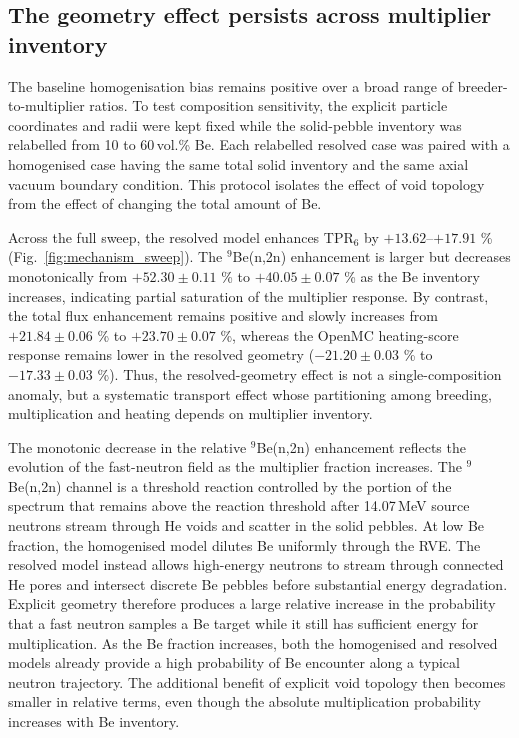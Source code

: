 \documentclass[preprint,12pt]{elsarticle}
\begin{document}
\subsection{The geometry effect persists across multiplier inventory}

The baseline homogenisation bias remains positive over a broad range of
breeder-to-multiplier ratios.  To test composition sensitivity, the explicit
particle coordinates and radii were kept fixed while the solid-pebble inventory
was relabelled from 10 to 60\,vol.\% Be.  Each relabelled resolved case was
paired with a homogenised case having the same total solid inventory and the
same axial vacuum boundary condition.  This protocol isolates the effect of
void topology from the effect of changing the total amount of Be.

Across the full sweep, the resolved model enhances TPR$_6$ by
$+13.62$--$+17.91$ \% (Fig.~\ref{fig:mechanism_sweep}).  The $^9$Be(n,2n)
enhancement is larger but decreases monotonically from $+52.30\pm0.11$ \% to
$+40.05\pm0.07$ \% as the Be inventory increases, indicating partial saturation
of the multiplier response.  By contrast, the
total flux enhancement remains positive and slowly increases from
$+21.84\pm0.06$ \% to $+23.70\pm0.07$ \%, whereas the OpenMC heating-score response remains
lower in the resolved geometry ($-21.20\pm0.03$ \% to $-17.33\pm0.03$ \%).
Thus, the resolved-geometry
effect is not a single-composition anomaly, but a systematic transport effect
whose partitioning among breeding, multiplication and heating depends on
multiplier inventory.

The monotonic decrease in the relative $^9$Be(n,2n) enhancement reflects the
evolution of the fast-neutron field as the multiplier fraction increases.  The
$^9$Be(n,2n) channel is a threshold reaction controlled by the portion of the
spectrum that remains above the reaction threshold after 14.07\,MeV source
neutrons stream through He voids and scatter in the solid pebbles.  At low Be
fraction, the homogenised model dilutes Be uniformly through the RVE.  The
resolved model instead allows high-energy neutrons to stream through connected
He pores and intersect discrete Be pebbles before substantial energy
degradation.  Explicit geometry therefore produces a large relative increase in
the probability that a fast neutron samples a Be target while it still has
sufficient energy for multiplication.  As the Be fraction increases, both the
homogenised and resolved models already provide a high probability of Be
encounter along a typical neutron trajectory.  The additional benefit of
explicit void topology then becomes smaller in relative terms, even though the
absolute multiplication probability increases with Be inventory.
\end{document}
